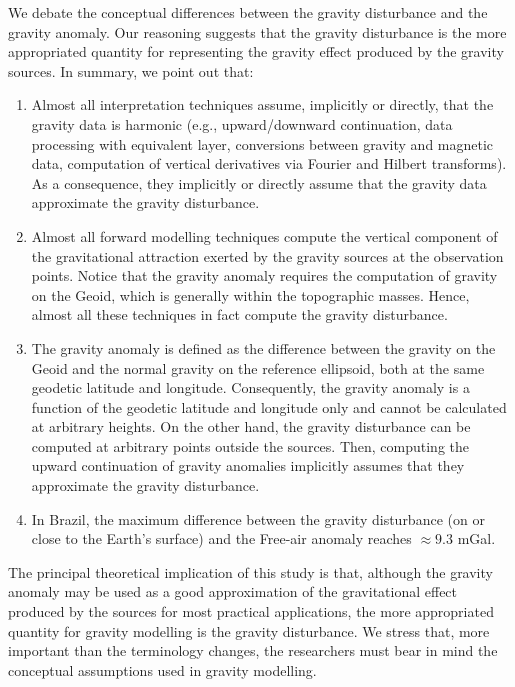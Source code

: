 \documentclass[extra]{gji}
\begin{document}
We debate the conceptual differences between the gravity
disturbance and the gravity anomaly.
Our reasoning suggests that the gravity disturbance is the
more appropriated quantity for representing the gravity
effect produced by the gravity sources.
In summary, we point out that:

\begin{enumerate}
\renewcommand{\theenumii}{\alph{enumii}}

\item Almost all interpretation techniques assume, implicitly or
directly, that the gravity data is harmonic (e.g., 
upward/downward continuation, 
data processing with equivalent layer,
conversions between gravity and magnetic data,
computation of vertical derivatives via Fourier and Hilbert
transforms). As a consequence, they implicitly or directly assume that
the gravity data approximate the gravity disturbance.

\item Almost all forward modelling techniques compute
the vertical component of the gravitational attraction 
exerted by the gravity sources at the observation points.
Notice that the gravity anomaly requires the computation of gravity
on the Geoid, which is generally within the topographic masses.
Hence, almost all these techniques in fact compute the gravity 
disturbance.

\item The gravity anomaly is defined as the difference between 
the gravity on the Geoid and the normal gravity on the reference 
ellipsoid, both at the same geodetic latitude and longitude.
Consequently, the gravity anomaly is a function of
the geodetic latitude and longitude only and cannot
be calculated at arbitrary heights. On the other hand,
the gravity disturbance can be computed at arbitrary points
outside the sources. Then, computing the upward 
continuation of gravity anomalies implicitly assumes 
that they approximate the gravity disturbance.

\item In Brazil, the maximum difference between the gravity 
disturbance (on or close to the Earth's surface) and the Free-air
anomaly reaches $\approx 9.3$ mGal.

\end{enumerate}

The principal theoretical implication of this study is that,
although the gravity anomaly may be used as a good approximation of
the gravitational effect produced by the sources for most practical applications,
the more appropriated quantity for gravity modelling is the
gravity disturbance. We stress that, more important than the 
terminology changes, the researchers must bear in mind the 
conceptual assumptions used in gravity modelling.
\end{document}
